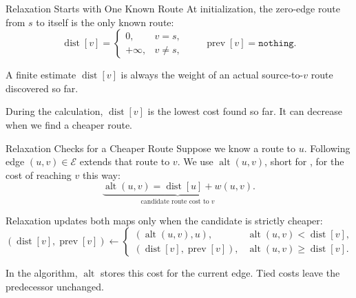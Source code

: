 \documentclass[aspectratio=169,11pt]{beamer}
\begin{document}
\begin{frame}{Relaxation Starts with One Known Route}
  At initialization, the zero-edge route from $s$ to itself is the only known route:
  \[
    \operatorname{dist}[v]=
    \begin{cases}
      0, & v=s,\\
      +\infty, & v\neq s,
    \end{cases}
    \qquad
    \operatorname{prev}[v]=\texttt{nothing}.
  \]

  \vspace{0.8em}
  A finite estimate $\operatorname{dist}[v]$ is always the weight of an actual
  source-to-$v$ route discovered so far.

  \vspace{0.6em}
  During the calculation, $\operatorname{dist}[v]$ is the lowest cost found so far.
  It can decrease when we find a cheaper route.
\end{frame}

\begin{frame}{Relaxation Checks for a Cheaper Route}
  Suppose we know a route to $u$. Following edge $(u,v)\in\mathcal E$
  extends that route to $v$.
  We use $\operatorname{alt}(u,v)$, short for ,
  for the cost of reaching $v$ this way:
  \[
    \underbrace{\operatorname{alt}(u,v)=
      \operatorname{dist}[u]+w(u,v)}_{\text{candidate route cost to }v}.
  \]

  Relaxation updates both maps only when the candidate is strictly cheaper:
  \[
  (\operatorname{dist}[v],\operatorname{prev}[v])\leftarrow
  \begin{cases}
    (\operatorname{alt}(u,v),u),
      & \operatorname{alt}(u,v)<\operatorname{dist}[v],\\[3pt]
    (\operatorname{dist}[v],\operatorname{prev}[v]),
      & \operatorname{alt}(u,v)\geq\operatorname{dist}[v].
  \end{cases}
  \]

  In the algorithm, $\operatorname{alt}$ stores this cost for the current edge.
  Tied costs leave the predecessor unchanged.
\end{frame}
\end{document}
